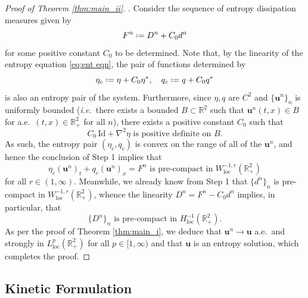 \documentclass[11pt,a4paper,reqno]{amsart}
\numberwithin{equation}{section}
\theoremstyle{definition}
\theoremstyle{remark}
\newcommand{\bu}{\mathbf{u}}
\newcommand{\loc}{\mathrm{loc}}
\newcommand*{\defeq}{\mathrel{\vcenter{\baselineskip0.5ex \lineskiplimit0pt
                     \hbox{\scriptsize.}\hbox{\scriptsize.}}}%
                     =}
\begin{document}
{\begin{proof}[Proof of Theorem \ref{thm:main_ii}]
    \smallskip 
    . Consider the sequence of entropy dissipation measures given by 
    \begin{equation*}
        F^n \defeq D^n + C_0 d^n 
    \end{equation*}
    for some positive constant $C_0$ to be determined. Note that, by the linearity of the entropy equation \eqref{eq:ent eqn}, the pair of functions determined by 
    \begin{equation*}
        \eta_c \defeq \eta + C_0 \eta^*, \quad q_c \defeq q + C_0 q^* 
    \end{equation*}
    is also an entropy pair of the system. Furthermore, since $\eta,q$ are $C^2$ and $\{\bu^n\}_n$ is uniformly bounded (\textit{i.e.}~there exists a bounded $B \subset \mathbb{R}^2$ such that $\bu^n(t,x) \in B$ for a.e.~$(t,x) \in \mathbb{R}^2_+$ for all $n$), there exists a positive constant $C_0$ such that 
    \begin{equation*}
        C_0 \, \mathrm{Id} + \nabla^2\eta \text{ is positive definite on } B. 
    \end{equation*}
As such, the entropy pair $(\eta_c,q_c)$ is convex on the range of all of the $\bu^n$, and hence the conclusion of Step 1 implies that 
\begin{equation*}
    \eta_c(\bu^n)_t + q_c(\bu^n)_x = F^n \text{ is pre-compact in } W^{-1,r}_\loc(\mathbb{R}^2_+) 
\end{equation*}
for all $r \in (1,\infty)$. Meanwhile, we already know from Step 1 that $\{d^n\}_n$ is pre-compact in $W^{-1,r}_\loc(\mathbb{R}^2_+)$, whence the linearity $D^n = F^n - C_0 d^n$ implies, in particular, that $$\{D^n\}_n \text{ is pre-compact in } H^{-1}_\loc(\mathbb{R}^2_+).$$
As per the proof of Theorem \ref{thm:main_i}, we deduce that $\bu^n \to \bu$ a.e.~and strongly in $L^p_\loc(\mathbb{R}^2_+)$ for all $p \in [1,\infty)$ and that $\bu$ is an entropy solution, which completes the proof.
\end{proof}

\subsection{Kinetic Formulation}\label{sec:proof of kinetic}

}
\end{document}
